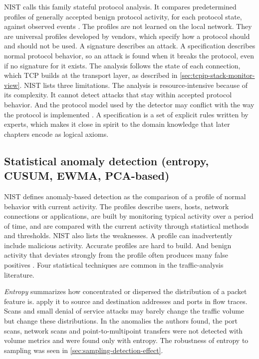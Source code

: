 NIST calls this family stateful protocol analysis. It compares predetermined
profiles of generally accepted benign protocol activity, for each protocol
state, against observed events \citep{scarfone2007nist80094}. The profiles are
not learned on the local network. They are universal profiles developed by
vendors, which specify how a protocol should and should not be used. A
signature describes an attack. A specification describes normal protocol
behavior, so an attack is found when it breaks the protocol, even if no
signature for it exists. The analysis follows the state of each connection,
which TCP builds at the transport layer, as described in
\cref{sec:tcpip-stack-monitor-view}. NIST lists three limitations. The
analysis is resource-intensive because of its complexity. It cannot detect
attacks that stay within accepted protocol behavior. And the protocol model
used by the detector may conflict with the way the protocol is implemented
\citep{scarfone2007nist80094}. A specification is a set of explicit rules
written by experts, which makes it close in spirit to the domain knowledge
that later chapters encode as logical axioms.

\subsection{Statistical anomaly detection (entropy, CUSUM, EWMA, PCA-based)}
\label{sec:statistical-anomaly-detection}

NIST defines anomaly-based detection as the comparison of a profile of normal
behavior with current activity. The profiles describe users, hosts, network
connections or applications, are built by monitoring typical activity over a
period of time, and are compared with the current activity through
statistical methods and thresholds. NIST also lists the weaknesses. A profile
can inadvertently include malicious activity. Accurate profiles are hard to
build. And benign activity that deviates strongly from the profile often
produces many false positives \citep{scarfone2007nist80094}. Four
statistical techniques are common in the traffic-analysis literature.

\emph{Entropy} summarizes how concentrated or dispersed the distribution of a
packet feature is. \citet{lakhina2005mining} apply it to source and
destination addresses and ports in flow traces. Scans and small denial of
service attacks may barely change the traffic volume but change these
distributions. In the anomalies the authors found, the port scans, network
scans and point-to-multipoint transfers were not detected with volume
metrics and were found only with entropy. The robustness of entropy to
sampling was seen in \cref{sec:sampling-detection-effect}.

